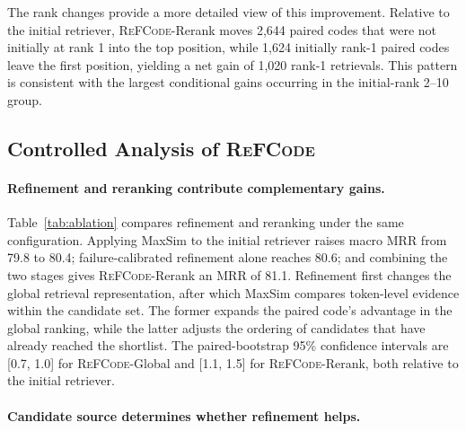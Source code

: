 \documentclass[11pt]{article}
\newcommand{\method}{\textsc{ReFCode}}
\begin{document}
The rank changes provide a more detailed view of this improvement. Relative to the initial retriever, \method{}-Rerank moves 2,644 paired codes that were not initially at rank 1 into the top position, while 1,624 initially rank-1 paired codes leave the first position, yielding a net gain of 1,020 rank-1 retrievals. This pattern is consistent with the largest conditional gains occurring in the initial-rank 2--10 group.

\subsection{Controlled Analysis of \method{}}
\label{sec:component_analysis}

\paragraph{Refinement and reranking contribute complementary gains.}
Table~\ref{tab:ablation} compares refinement and reranking under the same configuration. Applying MaxSim to the initial retriever raises macro MRR from 79.8 to 80.4; failure-calibrated refinement alone reaches 80.6; and combining the two stages gives \method{}-Rerank an MRR of 81.1. Refinement first changes the global retrieval representation, after which MaxSim compares token-level evidence within the candidate set. The former expands the paired code's advantage in the global ranking, while the latter adjusts the ordering of candidates that have already reached the shortlist. The paired-bootstrap 95\% confidence intervals are [0.7, 1.0] for \method{}-Global and [1.1, 1.5] for \method{}-Rerank, both relative to the initial retriever.

\paragraph{Candidate source determines whether refinement helps.}
\label{sec:candidate_controls}
\end{document}
